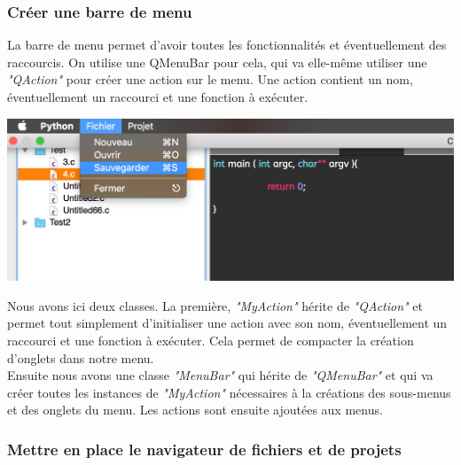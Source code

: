 \documentclass[a4paper,12pt]{article}
\begin{document}
			\subsubsection*{Créer une barre de menu}
			
				La barre de menu permet d'avoir toutes les fonctionnalités et éventuellement des raccourcis. On utilise une QMenuBar pour cela, qui va elle-même utiliser une \textit{"QAction"} pour créer une action sur le menu. Une action contient un nom, éventuellement un raccourci et une fonction à exécuter. \\
			\begin{center}
				\includegraphics[scale=0.6]{images/QMenuBar}
				\vspace{0.5cm}
			\end{center}
			Nous avons ici deux classes. La première, \textit{"MyAction"} hérite de \textit{"QAction"} et permet tout simplement d'initialiser une action avec son nom, éventuellement un raccourci et une fonction à exécuter. Cela permet de compacter la création d'onglets dans notre menu.\\
			Ensuite nous avons une classe \textit{"MenuBar"} qui hérite de \textit{"QMenuBar"} et qui va créer toutes les instances de \textit{"MyAction"} nécessaires à la créations des sous-menus et des onglets du menu. Les actions sont ensuite ajoutées aux menus.\\
			
			\subsubsection*{Mettre en place le navigateur de fichiers et de projets}
			
\end{document}
